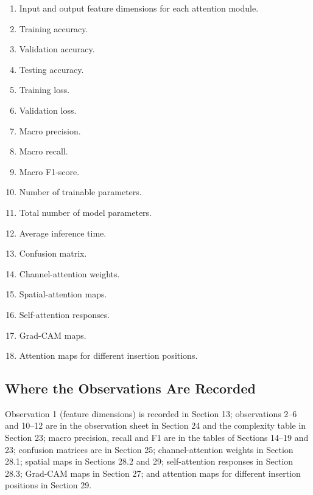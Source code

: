 \documentclass[10pt]{article}
\begin{document}
\begin{enumerate}

\item Input and output feature dimensions for each attention module.

\item Training accuracy.

\item Validation accuracy.

\item Testing accuracy.

\item Training loss.

\item Validation loss.

\item Macro precision.

\item Macro recall.

\item Macro F1-score.

\item Number of trainable parameters.

\item Total number of model parameters.

\item Average inference time.

\item Confusion matrix.

\item Channel-attention weights.

\item Spatial-attention maps.

\item Self-attention responses.

\item Grad-CAM maps.

\item Attention maps for different insertion positions.

\end{enumerate}


\subsection*{Where the Observations Are Recorded}
Observation 1 (feature dimensions) is recorded in Section 13; observations 2--6 and 10--12 are in the observation sheet in Section 24 and the complexity table in Section 23; macro precision, recall and F1 are in the tables of Sections 14--19 and 23; confusion matrices are in Section 25; channel-attention weights in Section 28.1; spatial maps in Sections 28.2 and 29; self-attention responses in Section 28.3; Grad-CAM maps in Section 27; and attention maps for different insertion positions in Section 29.
\end{document}
